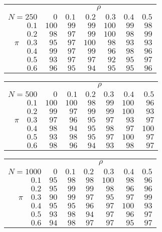 \begin{tabular}{r|rrrrrr}
\hline\hline
 &\multicolumn{6}{c}{$\rho$} \\ 
 $N = 250$ & $0$ & $0.1$ & $0.2$ & $0.3$ & $0.4$ & $0.5$ \\ 
 \hline$0.1$ & $100$ & $99$ & $99$ & $100$ & $99$ & $98$\\ 
$0.2$ & $98$ & $97$ & $99$ & $100$ & $98$ & $99$\\ 
$\pi\quad$$0.3$ & $95$ & $97$ & $100$ & $98$ & $93$ & $93$\\ 
$0.4$ & $99$ & $97$ & $99$ & $96$ & $98$ & $96$\\ 
$0.5$ & $93$ & $97$ & $97$ & $92$ & $95$ & $97$\\ 
$0.6$ & $96$ & $95$ & $94$ & $95$ & $95$ & $96$\\ 
 \hline 
 \end{tabular}
 
 \vspace{2em} 
 
\begin{tabular}{r|rrrrrr}
\hline\hline
 &\multicolumn{6}{c}{$\rho$} \\ 
 $N = 500$ & $0$ & $0.1$ & $0.2$ & $0.3$ & $0.4$ & $0.5$ \\ 
 \hline$0.1$ & $100$ & $100$ & $98$ & $99$ & $100$ & $96$\\ 
$0.2$ & $99$ & $97$ & $99$ & $99$ & $100$ & $93$\\ 
$\pi\quad$$0.3$ & $97$ & $96$ & $95$ & $97$ & $93$ & $97$\\ 
$0.4$ & $98$ & $94$ & $95$ & $98$ & $97$ & $100$\\ 
$0.5$ & $93$ & $98$ & $95$ & $97$ & $100$ & $97$\\ 
$0.6$ & $98$ & $96$ & $94$ & $93$ & $98$ & $97$\\ 
 \hline 
 \end{tabular}
 
 \vspace{2em} 
 
\begin{tabular}{r|rrrrrr}
\hline\hline
 &\multicolumn{6}{c}{$\rho$} \\ 
 $N = 1000$ & $0$ & $0.1$ & $0.2$ & $0.3$ & $0.4$ & $0.5$ \\ 
 \hline$0.1$ & $95$ & $98$ & $98$ & $100$ & $98$ & $96$\\ 
$0.2$ & $95$ & $99$ & $99$ & $98$ & $96$ & $96$\\ 
$\pi\quad$$0.3$ & $90$ & $99$ & $97$ & $95$ & $97$ & $99$\\ 
$0.4$ & $95$ & $95$ & $96$ & $97$ & $100$ & $93$\\ 
$0.5$ & $93$ & $98$ & $94$ & $97$ & $96$ & $97$\\ 
$0.6$ & $94$ & $98$ & $97$ & $97$ & $95$ & $97$\\ 
 \hline 
 \end{tabular}